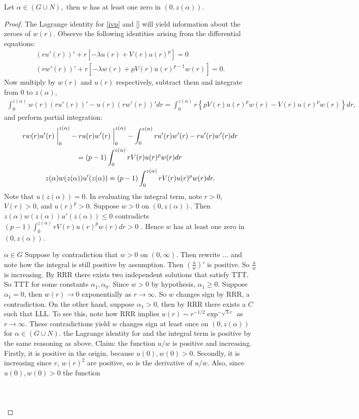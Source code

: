 \newpage
\begin{lemma}Let $\alpha\in (G\cup N),\text{ then }w$ has at least one zero in $(0,z(\alpha))$.
\begin{proof}
The Lagrange identity for \ref{ivp} and \ref{} will yield information about the zeroes of $w(r)$. Observe the following identities arising from the differential equations:\begin{gather*}
(ru'(r))'+r\left[-\lambda u(r)+V(r)u(r)^p\right]=0\\
(rw'(r))'+r\left[-\lambda w(r)+pV(r)u(r)^{p-1}w(r)\right]=0.
\end{gather*} Now multiply by $w(r)$ and $u(r)$ respectively, subtract them and integrate from 0 to $z(\alpha)$, \begin{gather*}
\int_0^{z(\alpha)}w(r)(ru'(r))'-u(r)(rw'(r))'dr=%
\int_0^{z(\alpha)}r\left\{pV(r)u(r)^pw(r)-V(r)u(r)^pw(r)\right\}dr,
\end{gather*} and perform partial integration:\begin{gather*}
rw(r)u'(r)\at_0^{z(\alpha)}-ru(r)w'(r)\at_0^{z(\alpha)}-\int_0^{z(\alpha)}ru'(r)w'(r)-ru'(r)w'(r)dr\\=(p-1)\int_0^{z(\alpha)}rV(r)u(r)^pw(r)dr\\z(\alpha)w(z(\alpha))u'(z(\alpha))=(p-1)\int_0^{z(\alpha)}rV(r)u(r)^pw(r)dr.
\end{gather*} Note that $u(z(\alpha))=0$.   In evaluating the integral term, {\color{gray}note $r>0$, $V(r)>0$, and $u(r)^p>0$. Suppose $w>0$ on $(0,z(\alpha))$. Then $z(\alpha)w(z(\alpha))u'(z(\alpha))\leq0$ contradicts $(p-1)\int_0^{z(\alpha)}rV(r)u(r)^pw(r)dr>0$ \Lightning. Hence $w$ has at least one zero in $(0,z(\alpha))$.}

\underline{$\alpha\in G$} Suppose by contradiction that $w>0$ on $(0,\infty)$. {\color{gray} Then rewrite ... and note how the integral is still positive by assumption. Then $\left(\frac{u}{w}\right)'$ is positive. So $\frac{u}{w}$ is increasing. By RRR there exists two independent solutions that satisfy TTT. So TTT for some constants $\alpha_1,\alpha_0$. Since $w>0$ by hypothesis, $\alpha_1\geq0$. Suppose $\alpha_1=0$, then $w(r)\to0$ exponentially as $r\to\infty$. So $w$ changes sign by RRR, a contradiction. On the other hand, suppose $\alpha_1>0$, then by RRR there exists a $C$ such that LLL. To see this, note how RRR implies $u(r)\sim r^{-1/2}\exp^{-\sqrt{\lambda}r}$ as $r\to\infty$. These contradictions yield $w$ changes sign at least once on $(0,z(\alpha))$ for $\alpha\in(G\cup N)$.} the Lagrange identity for and the integral term is positive by the same reasoning as above. Claim: the function $u/w$ is positive and increasing. Firstly, it is positive in the origin, because $u(0),w(0)>0$. Secondly, it is increasing since $r$, $w(r)^2$ are positive, so is the derivative of $u/w$. Also, since $u(0),w(0)>0$ the function \\ \\
\underline{}\\ \\
\underline{}
\end{proof}
\end{lemma}